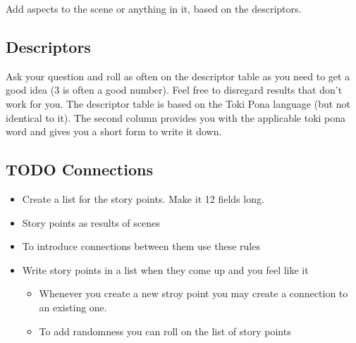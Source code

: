\documentclass[11pt]{article}
\begin{document}
{Add aspects to the scene or anything in it, based on the descriptors.
\subsection{Descriptors}
\label{sec:org9ca806d}

Ask your question and roll as often on the descriptor table as you need to get a good idea (3 is often a good number). Feel free to disregard results that don't work for you.
The descriptor table is based on the Toki Pona language (but not identical to it). The second column provides you with the applicable toki pona word and gives you a short form to write it down. 
\subsection{{\bfseries\sffamily TODO} Connections}
\label{sec:org0d53eb6}
\begin{itemize}
\item Create a list for the story points. Make it 12 fields long.
\item Story points as results of scenes
\item To introduce connections between them use these rules
\item Write story points in a list when they come up and you feel like it
\begin{itemize}
\item Whenever you create a new stroy point you may create a connection to an existing one.
\item To add randomness you can roll on the list of story points
\end{itemize}
\end{itemize}

\newpage
}
\end{document}
